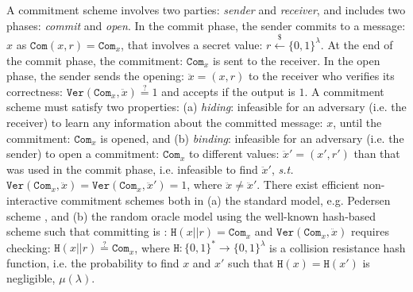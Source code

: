  A commitment scheme involves two parties:  \emph{sender} and  \emph{receiver}, and includes  two phases: \emph{commit} and  \emph{open}. In the commit phase, the sender  commits to a message: $x$ as $\mathtt{Com}(x,r)=\mathtt{Com}_{\scriptscriptstyle x}$, that involves a secret value: $r\stackrel{\scriptscriptstyle\$}\leftarrow \{0,1\}^{\scriptscriptstyle\lambda}$. At the end of the commit phase,  the commitment: $\mathtt{Com}_{\scriptscriptstyle x}$ is sent to the receiver. In the open phase, the sender sends the opening: $\ddot{x}=(x,r)$ to the receiver who verifies its correctness: $\mathtt{Ver}(\mathtt{Com}_{\scriptscriptstyle x},\ddot{x})\stackrel{\scriptscriptstyle ?}=1$ and accepts if the output is $1$.  A commitment scheme must satisfy two properties: (a) \textit{hiding}: infeasible for an adversary (i.e. the receiver) to learn any information about the committed  message: $x$, until the commitment: $\mathtt{Com}_{\scriptscriptstyle x}$ is opened, and (b) \textit{binding}:   infeasible for an adversary (i.e. the sender) to open a commitment: $\mathtt{Com}_{\scriptscriptstyle x}$ to different values: $\ddot{x}'=(x',r')$ than that was  used in the commit phase, i.e. infeasible to find  $\ddot{x}'$, \textit{s.t.} $\mathtt{Ver}(\mathtt{Com}_{\scriptscriptstyle x},\ddot{x})=\mathtt{Ver}(\mathtt{Com}_{\scriptscriptstyle x},\ddot{x}')=1$, where $\ddot{x}\neq \ddot{x}'$.  There exist efficient non-interactive  commitment schemes both in (a) the standard model, e.g. Pedersen scheme \cite{Pedersen91}, and (b)  the random oracle model using the well-known hash-based scheme such that committing  is : $\mathtt{H}(x||r)=\mathtt{Com}_{\scriptscriptstyle x}$ and $\mathtt{Ver}(\mathtt{Com}_{\scriptscriptstyle x},\ddot{x})$ requires checking: $\mathtt{H}(x||r)\stackrel{\scriptscriptstyle ?}=\mathtt{Com}_{\scriptscriptstyle x}$, where $\mathtt{H}:\{0,1\}^{\scriptscriptstyle *}\rightarrow \{0,1\}^{\scriptscriptstyle \lambda}$ is a collision resistance hash function, i.e. the probability to find $x$ and $x'$ such that $\mathtt{H}(x)=\mathtt{H}(x')$ is negligible, $\mu(\lambda)$.
%
